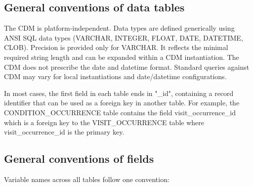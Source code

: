 \documentclass[11pt]{book}
\theoremstyle{definition}
\theoremstyle{definition}
\theoremstyle{definition}
\theoremstyle{remark}
\begin{document}
\hypertarget{general-conventions-of-data-tables}{%
\subsection{General conventions of data tables}\label{general-conventions-of-data-tables}}

The CDM is platform-independent. Data types are defined generically using ANSI SQL data types (VARCHAR, INTEGER, FLOAT, DATE, DATETIME, CLOB). Precision is provided only for VARCHAR. It reflects the minimal required string length and can be expanded within a CDM instantiation. The CDM does not prescribe the date and datetime format. Standard queries against CDM may vary for local instantiations and date/datetime configurations.

In most cases, the first field in each table ends in "\_id", containing a record identifier that can be used as a foreign key in another table. For example, the CONDITION\_OCCURRENCE table contains the field visit\_occurrence\_id which is a foreign key to the VISIT\_OCCURRENCE table where visit\_occurrence\_id is the primary key.

\hypertarget{general-conventions-of-fields}{%
\subsection{General conventions of fields}\label{general-conventions-of-fields}}

Variable names across all tables follow one convention:
\end{document}
